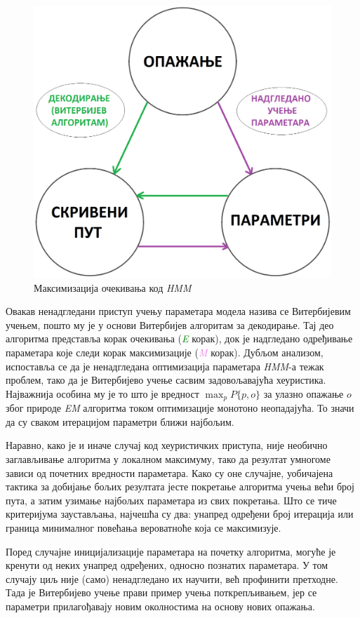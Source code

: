 \documentclass[12pt,oneside]{memoir}
\begin{document}
\begin{CJK}{UTF8}{ipxm}
\begin{figure}[H]
  \centering
  \includegraphics[width=.65\textwidth]{ema.png}
  \caption{Максимизација очекивања код \textit{HMM}}
  \label{fig:ema}
\end{figure}

Овакав ненадгледани приступ учењу параметара модела назива се Витербијевим учењем, пошто му је у основи Витербијев алгоритам за декодирање. Тај део алгоритма представља корак очекивања (\textit{\textcolor{green}{E}} корак), док је надгледано одређивање параметара које следи корак максимизације (\textit{\textcolor{violet}{M}} корак). Дубљом анализом, испоставља се да је ненадгледана оптимизација параметара \textit{HMM}-а тежак проблем, тако да је Витербијево учење сасвим задовољавајућа хеуристика. Најважнија особина му је то што је вредност $\max_p P\{p, o\}$ за улазно опажање $o$ због природе \textit{EM} алгоритма током оптимизације монотоно неопадајућа. То значи да су сваком итерацијом параметри ближи најбољим.

Наравно, како је и иначе случај код хеуристичких приступа, није необично заглављивање алгоритма у локалном максимуму, тако да резултат умногоме зависи од почетних вредности параметара. Како су оне случајне, уобичајена тактика за добијање бољих резултата јесте покретање алгоритма учења већи број пута, а затим узимање најбољих параметара из свих покретања. Што се тиче критеријума заустављања, најчешћа су два: унапред одређени број итерација или граница минималног повећања вероватноће која се максимизује.

Поред случајне иницијализације параметара на почетку алгоритма, могуће је кренути од неких унапред одређених, односно познатих параметара. У том случају циљ није (само) ненадгледано их научити, већ профинити претходне. Тада је Витербијево учење прави пример учења поткрепљивањем, јер се параметри прилагођавају новим околностима на основу нових опажања.


\end{CJK}
\end{document}
